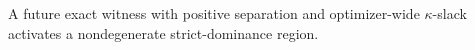 A future exact witness with positive separation and optimizer-wide \(\kappa\)-slack activates a nondegenerate strict-dominance region.